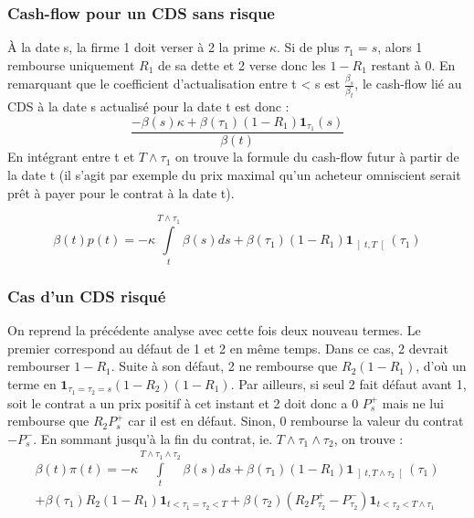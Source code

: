 \documentclass[a4paper]{article}
\begin{document}
\subsubsection{Cash-flow pour un CDS sans risque}
À la date s, la firme 1 doit verser à 2 la prime $\kappa$.
 Si de plus $\tau_1 = s$, alors 1 rembourse uniquement $R_1$ de sa dette et 2 verse donc les $1-R_1$ restant à 0.
 En remarquant que le coefficient d'actualisation entre t <  s est $\frac{\beta_{s}}{\beta_{t}}$, le cash-flow lié au CDS à la date s actualisé pour la date t est donc : 
\begin{equation*}
\frac{- \beta(s) \kappa+ \beta(\tau_{1}) \left( 1 - R_{1} \right)  \mathbf{ 1 }_{\tau_{1} } \left( s \right) }{\beta (t)} 
\end{equation*}
En intégrant entre t et $T \wedge \tau_{1}$ on trouve la formule du cash-flow futur à partir de la date t (il s'agit par exemple du prix maximal qu'un acheteur omniscient serait prêt à payer pour le contrat à la date t).

\begin{equation}
\beta (t) p(t) = -\kappa \int\limits_{t}^{T \wedge \tau_{1}} \beta(s)ds + \beta(\tau_{1})\left( 1 - R_{1} \right)\mathbf{ 1 }_{\left] t, T \right[}(\tau_{1})
\end{equation}
\subsubsection{Cas d'un CDS risqué}
On reprend la précédente analyse avec cette fois deux nouveau termes.
 Le premier correspond au défaut de 1 et 2 en même temps.
 Dans ce cas, 2 devrait rembourser $1-R_{1}$.
 Suite à son défaut, 2 ne rembourse que $R_{2}(1-R_{1})$, d'où un terme en $\mathbf{1}_{\tau_{1} = \tau_{2} = s} (1-R_{2})(1-R_{1})$.
 Par ailleurs, si seul 2 fait défaut avant 1, soit le contrat a un prix positif à cet instant et 2 doit donc a 0 $P_{s}^{+}$ mais ne lui rembourse que $R_{2}P_{s}^{+}$ car il est en défaut.
 Sinon, 0 rembourse la valeur du contrat $-P_{s}^{-}$.
 En sommant jusqu'à la fin du contrat, ie.
 $T \wedge \tau_{1} \wedge \tau_{2}$, on trouve :
\begin{multline}
\beta(t)\pi(t) = -\kappa \int\limits_{t}^{T \wedge \tau_{1} \wedge \tau_{2}} \beta(s)ds + \beta\left(\tau_{1}\right)\left( 1 - R_{1} \right)\mathbf{ 1 }_{\left] t, T \wedge \tau_{2} \right[}(\tau_{1}) \\
+ \beta(\tau_{1}) R_{2} \left( 1 - R_{1} \right) \mathbf{1}_{t < \tau_{1} = \tau_{2} < T} 
+ \beta(\tau_{2}) \left( R_{2}P_{\tau_{2}}^{+} - P_{\tau_{2}}^{-} \right) \mathbf{1}_{t < \tau_{2} < T \wedge \tau_{1}}
\end{multline}
\end{document}
